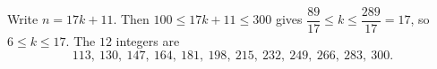 Write $n=17k+11$. Then $100\le17k+11\le300$ gives $\dfrac{89}{17}\le k\le\dfrac{289}{17}=17$, so $6\le k\le17$. The $12$ integers are
\[\boxed{113,\ 130,\ 147,\ 164,\ 181,\ 198,\ 215,\ 232,\ 249,\ 266,\ 283,\ 300}.\]
